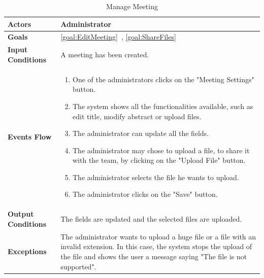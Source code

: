 \begin{table}[H]
\centering
\def\arraystretch{1.5}
\begin{tabular}{|p{7cm}|p{7cm}|}
	\hline
	\textbf{Actors}            & Administrator    \\ \hline
	\textbf{Goals}             & \ref{goal:EditMeeting}~, \ref{goal:ShareFiles}           \\ \hline
	\textbf{Input Conditions}  & A meeting has been created.           \\ \hline
	\textbf{Events Flow}       &  
	\begin{enumerate}[topsep=0pt, leftmargin=*]
		\item One of the administrators clicks on the "Meeting Settings" button.
		\item The system shows all the functionalities available, such as edit title, modify abstract or upload files.
		\item The administrator can update all the fields.
		\item The administrator may chose to upload a file, to share it with the team, by clicking on the "Upload File" button.
		\item The administrator selects the file he wants to upload.
		\item The administrator clicks on the "Save" button.
	\end{enumerate}             \\ \hline
	\textbf{Output Conditions} & The fields are updated and the selected files are uploaded.          \\ \hline
	\textbf{Exceptions}        & The administrator wants  to upload a huge file or a file with an invalid extension. In this case, the system stops the upload of the file and shows the user a message saying "The file is not supported". \\ \hline
\end{tabular}
\caption{Manage Meeting}
\end{table}

